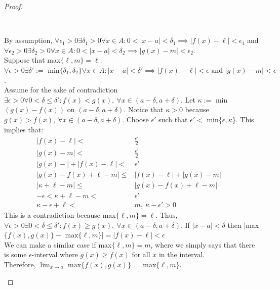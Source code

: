 \documentclass[11pt]{article}
\newenvironment{myproof}
{\begin{proof} \begin{adjustwidth}{3em}{0pt}$ $\par\nobreak\ignorespaces}
{\end{adjustwidth} \end{proof}}
\begin{document}
\begin{flushleft}
\begin{myproof}
By assumption, $\forall \epsilon_1 > 0 \exists \delta_1 > 0 \forall x \in A: 0 < |x-a| < \delta_1 \implies |f(x) - \ell| < \epsilon_1$ and $\forall \epsilon_2 > 0 \exists \delta_2 > 0 \forall x \in A: 0 < |x-a| < \delta_2 \implies |g(x) - m| < \epsilon_2$. \\
\bigskip
Suppose that max$\{ \ell, m \} = \ell$.\\
$\forall \epsilon > 0 \exists \delta' := \text{ min}\{\delta_1, \delta_2 \} \forall x \in A:|x-a|< \delta' \implies |f(x)- \ell| < \epsilon \text{ and } |g(x) - m| < \epsilon$. \\
Assume for the sake of contradiction $\exists \epsilon > 0 \forall 0< \delta \leq \delta':f(x) < g(x), \ \forall x \in (a-\delta, a+\delta)$. Let $\kappa:=$ min$(g(x)-f(x))$ on $(a-\delta, a+\delta)$. Notice that $\kappa > 0$ because $g(x) > f(x), \ \forall x \in (a-\delta, a+\delta)$. Choose $\epsilon'$ such that $\epsilon' < \text{ min}\{ \epsilon, \kappa \}$.  This implies that:
\begin{align*}
|f(x) - \ell | < & \frac{\epsilon'}{2} \\
|g(x) - m| < & \frac{\epsilon'}{2} \\
|g(x) -  | + |f(x) - \ell| < & \epsilon' \\
|g(x) - f(x) + \ell - m| \leq & |f(x) - \ell | + |g(x) - m| \\
|\kappa + \ell -m| \leq & |g(x) - f(x) + \ell - m| &  \\
-\epsilon < \kappa + \ell -m < & \epsilon' \\
\kappa - \epsilon + \ell < & m , \ \kappa - \epsilon' > 0
\end{align*}
This is a contradiction because max$\{ \ell, m\} = \ell$. Thus, $\forall \epsilon > 0 \exists 0< \delta \leq \delta': f(x) \geq g(x), \ \forall x \in (a - \delta, a+ \delta)$. If $|x-a| < \delta$ then $|$max$\{ f(x), g(x) \} - \text{ max}\{ \ell, m \}| = |f(x) - \ell| < \epsilon$ \\
\bigskip
We can make a similar case if max$\{ \ell, m \} = m$, where we simply says that there is some $\epsilon$-interval where $g(x) \geq f(x)$ for all $x$ in the interval. \\
\bigskip
Therefore, $\lim_{x\to a} \text{ max}\{ f(x), g(x) \} = \text{ max}\{ \ell, m \}$.

\end{myproof}
\newpage


\end{flushleft}
\end{document}
